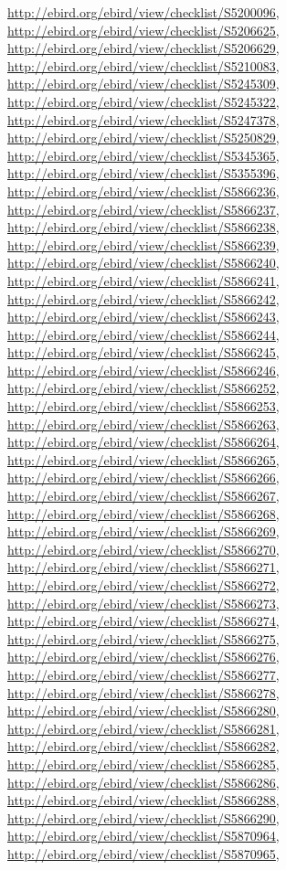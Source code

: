 \documentclass[9pt, article]{memoir}
\begin{document}
\begin{multicols}{2}
\url{http://ebird.org/ebird/view/checklist/S5200096}, 
\url{http://ebird.org/ebird/view/checklist/S5206625}, 
\url{http://ebird.org/ebird/view/checklist/S5206629}, 
\url{http://ebird.org/ebird/view/checklist/S5210083}, 
\url{http://ebird.org/ebird/view/checklist/S5245309}, 
\url{http://ebird.org/ebird/view/checklist/S5245322}, 
\url{http://ebird.org/ebird/view/checklist/S5247378}, 
\url{http://ebird.org/ebird/view/checklist/S5250829}, 
\url{http://ebird.org/ebird/view/checklist/S5345365}, 
\url{http://ebird.org/ebird/view/checklist/S5355396}, 
\url{http://ebird.org/ebird/view/checklist/S5866236}, 
\url{http://ebird.org/ebird/view/checklist/S5866237}, 
\url{http://ebird.org/ebird/view/checklist/S5866238}, 
\url{http://ebird.org/ebird/view/checklist/S5866239}, 
\url{http://ebird.org/ebird/view/checklist/S5866240}, 
\url{http://ebird.org/ebird/view/checklist/S5866241}, 
\url{http://ebird.org/ebird/view/checklist/S5866242}, 
\url{http://ebird.org/ebird/view/checklist/S5866243}, 
\url{http://ebird.org/ebird/view/checklist/S5866244}, 
\url{http://ebird.org/ebird/view/checklist/S5866245}, 
\url{http://ebird.org/ebird/view/checklist/S5866246}, 
\url{http://ebird.org/ebird/view/checklist/S5866252}, 
\url{http://ebird.org/ebird/view/checklist/S5866253}, 
\url{http://ebird.org/ebird/view/checklist/S5866263}, 
\url{http://ebird.org/ebird/view/checklist/S5866264}, 
\url{http://ebird.org/ebird/view/checklist/S5866265}, 
\url{http://ebird.org/ebird/view/checklist/S5866266}, 
\url{http://ebird.org/ebird/view/checklist/S5866267}, 
\url{http://ebird.org/ebird/view/checklist/S5866268}, 
\url{http://ebird.org/ebird/view/checklist/S5866269}, 
\url{http://ebird.org/ebird/view/checklist/S5866270}, 
\url{http://ebird.org/ebird/view/checklist/S5866271}, 
\url{http://ebird.org/ebird/view/checklist/S5866272}, 
\url{http://ebird.org/ebird/view/checklist/S5866273}, 
\url{http://ebird.org/ebird/view/checklist/S5866274}, 
\url{http://ebird.org/ebird/view/checklist/S5866275}, 
\url{http://ebird.org/ebird/view/checklist/S5866276}, 
\url{http://ebird.org/ebird/view/checklist/S5866277}, 
\url{http://ebird.org/ebird/view/checklist/S5866278}, 
\url{http://ebird.org/ebird/view/checklist/S5866280}, 
\url{http://ebird.org/ebird/view/checklist/S5866281}, 
\url{http://ebird.org/ebird/view/checklist/S5866282}, 
\url{http://ebird.org/ebird/view/checklist/S5866285}, 
\url{http://ebird.org/ebird/view/checklist/S5866286}, 
\url{http://ebird.org/ebird/view/checklist/S5866288}, 
\url{http://ebird.org/ebird/view/checklist/S5866290}, 
\url{http://ebird.org/ebird/view/checklist/S5870964}, 
\url{http://ebird.org/ebird/view/checklist/S5870965}, 

\end{multicols}
\end{document}
